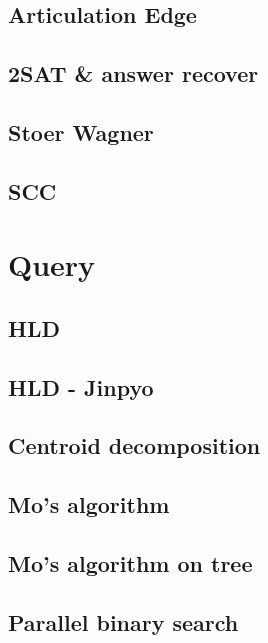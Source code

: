 \documentclass[10pt,landscape,a4paper,twocolumn]{article}
\begin{document}
\subsection{Articulation Edge}


\subsection{2SAT \& answer recover}


\subsection{Stoer Wagner}


\subsection{SCC}
%
\section{Query}
\subsection{HLD}


\subsection{HLD - Jinpyo}


\subsection{Centroid decomposition}


\subsection{Mo's algorithm}


\subsection{Mo's algorithm on tree}


\subsection{Parallel binary search}

\end{document}
